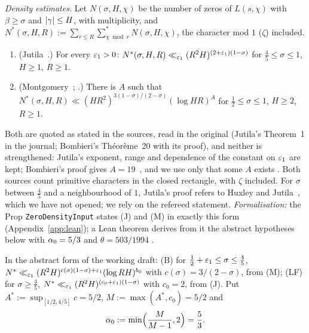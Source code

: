 \emph{Density estimates.} Let $N(\sigma,H,\chi)$ be the number of zeros of $L(s,\chi)$ with $\beta\ge\sigma$ and $\lvert \gamma\rvert\le H$, with multiplicity, and
$N^*(\sigma,H,R):=\sum_{r\le R}\sum^*_{\chi\bmod r}N(\sigma,H,\chi)$, the character mod $1$ ($\zeta$) included.
\begin{enumerate}
\item[\textbf{(J)}] (Jutila~\cite[Theorem~1, (1.8)]{Jutila77}.) For every $\varepsilon_1>0$: $N^*(\sigma,H,R)\ll_{\varepsilon_1}(R^2H)^{(2+\varepsilon_1)(1-\sigma)}$ for $\frac45\le\sigma\le1$,
$H\ge1$, $R\ge1$.
\item[\textbf{(M)}] (Montgomery~\cite{Montgomery69}; \cite[2nd ed., \S10, Th\'eor\`eme~20, p.~77]{BombieriAst18}.) There is $A$ such that
$N^*(\sigma,H,R)\ll(HR^2)^{3(1-\sigma)/(2-\sigma)}(\log HR)^A$ for $\frac12\le\sigma\le1$, $H\ge2$, $R\ge1$.
\end{enumerate}
Both are quoted as stated in the sources, read in the original (Jutila's Theorem~1 in the journal; Bombieri's Th\'eor\`eme~20 with its
proof), and neither is strengthened: Jutila's exponent, range and dependence of the constant on
$\varepsilon_1$ are kept; Bombieri's proof gives $A=19$~\cite[2nd ed., p.~80]{BombieriAst18}, and we use only that some $A$ exists \tagC. Both sources count primitive characters in the closed rectangle, with $\zeta$ included. For $\sigma$
between $\frac45$ and a neighbourhood of $1$, Jutila's proof refers to Huxley and Jutila~\cite{HuxleyJutila77}, which we have not opened; we rely on
the refereed statement.
\emph{Formalisation:} the Prop \texttt{ZeroDensityInput} states (J) and (M) in exactly this form (Appendix~\ref{app:lean}); a Lean theorem derives from it the
abstract hypotheses below with $\alpha_0=5/3$ and $\theta=503/1994$ \tagL.

In the abstract form of the working draft: (B) for $\frac12+\varepsilon_1\le\sigma\le\frac45$, $N^*\ll_{\varepsilon_1}(R^2H)^{c(\sigma)(1-\sigma)+\varepsilon_1}(\log RH)^{b_0}$ with
$c(\sigma)=3/(2-\sigma)$, from (M); (LF) for $\sigma\ge\frac45$, $N^*\ll_{\varepsilon_1}(R^2H)^{(c_0+\varepsilon_1)(1-\sigma)}$ with $c_0=2$, from (J). Put $A^*:=\sup_{[1/2,4/5]}c=5/2$,
$M:=\max(A^*,c_0)=5/2$ and
\[
\alpha_0:=\min\Bigl(\frac M{M-1},2\Bigr)=\frac53 .
\]

